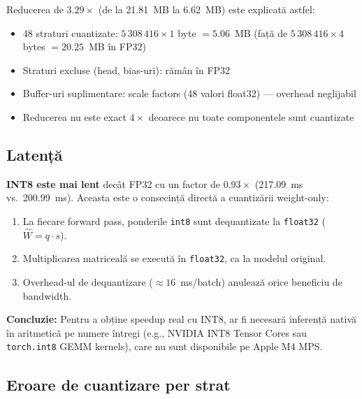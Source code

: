 \documentclass[12pt,a4paper]{article}
\begin{document}
Reducerea de $\mathbf{3.29\times}$ (de la 21.81~MB la 6.62~MB) este
explicată astfel:

\begin{itemize}
  \item 48 straturi cuantizate: $5\,308\,416 \times 1$ byte $= 5.06$~MB
    (față de $5\,308\,416 \times 4$ bytes $= 20.25$~MB în FP32)
  \item Straturi excluse (head, bias-uri): rămân în FP32
  \item Buffer-uri suplimentare: scale factors (48 valori float32) ---
    overhead neglijabil
  \item Reducerea nu este exact $4\times$ deoarece nu toate componentele
    sunt cuantizate
\end{itemize}

\subsection{Latență}

\textbf{INT8 este mai lent} decât FP32 cu un factor de $0.93\times$
(217.09~ms vs.\ 200.99~ms). Aceasta este o consecință directă a
cuantizării weight-only:

\begin{enumerate}
  \item La fiecare forward pass, ponderile \texttt{int8} sunt dequantizate
    la \texttt{float32} ($\hat{W} = q \cdot s$).
  \item Multiplicarea matriceală se execută în \texttt{float32},
    ca la modelul original.
  \item Overhead-ul de dequantizare ($\approx 16$~ms/batch) anulează orice
    beneficiu de bandwidth.
\end{enumerate}

\textbf{Concluzie:} Pentru a obține speedup real cu INT8, ar fi necesară
inferență nativă în aritmetică pe numere întregi (e.g., NVIDIA INT8 Tensor
Cores sau \texttt{torch.int8} GEMM kernels), care nu sunt disponibile pe
Apple M4 MPS.

\subsection{Eroare de cuantizare per strat}
\end{document}
